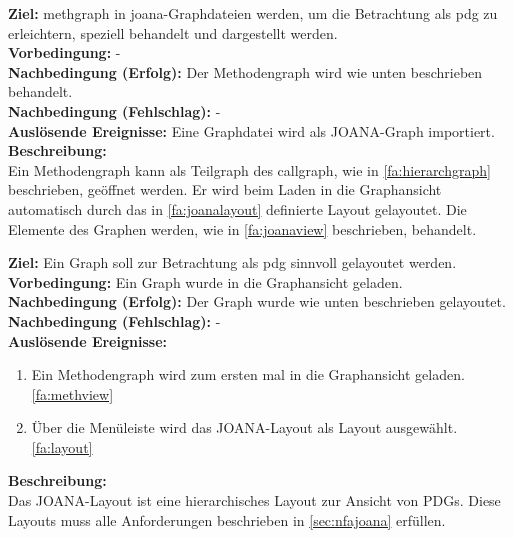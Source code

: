 \label{fa:methview}
\textbf{Ziel:} \gls{methgraph} in \gls{joana}-Graphdateien werden, um die Betrachtung als \gls{pdg} zu erleichtern, speziell behandelt und dargestellt werden.\\
\textbf{Vorbedingung:} -\\
\textbf{Nachbedingung (Erfolg):} Der Methodengraph wird wie unten beschrieben behandelt. \\
\textbf{Nachbedingung (Fehlschlag):} -\\
\textbf{Auslösende Ereignisse:} Eine Graphdatei wird als JOANA-Graph importiert.\\
\textbf{Beschreibung:}\\
Ein Methodengraph kann als Teilgraph des \gls{callgraph}, wie in \ref{fa:hierarchgraph} beschrieben, geöffnet werden.
Er wird beim Laden in die Graphansicht automatisch durch das in \ref{fa:joanalayout} definierte Layout gelayoutet.
Die Elemente des Graphen werden, wie in \ref{fa:joanaview} beschrieben, behandelt.

\label{fa:joanalayout}
\textbf{Ziel:} Ein Graph soll zur Betrachtung als \gls{pdg} sinnvoll gelayoutet werden.\\ %
\textbf{Vorbedingung:} Ein Graph wurde in die Graphansicht geladen.\\
\textbf{Nachbedingung (Erfolg):} Der Graph wurde wie unten beschrieben gelayoutet.\\
\textbf{Nachbedingung (Fehlschlag):} -\\
\textbf{Auslösende Ereignisse:}
\begin{enumerate}[nolistsep, label=(\alph*)]
  \item Ein Methodengraph wird zum ersten mal in die Graphansicht geladen. \ref{fa:methview}
  \item Über die Menüleiste wird das JOANA-Layout als Layout ausgewählt. \ref{fa:layout}
\end{enumerate}
\textbf{Beschreibung:}\\
Das JOANA-Layout ist eine hierarchisches Layout zur Ansicht von PDGs.
Diese Layouts muss alle Anforderungen beschrieben in \ref{sec:nfajoana} erfüllen.

